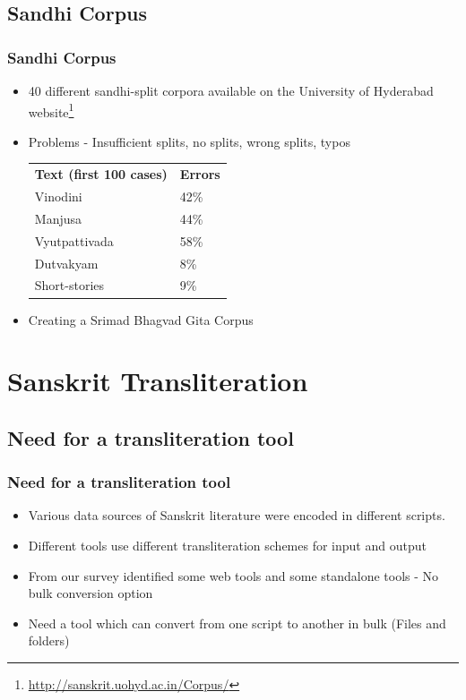 \documentclass[xcolor=dvipsnames]{beamer}
\begin{document}
\subsection{Sandhi Corpus}
\begin{frame}
\frametitle{Sandhi Corpus}
\begin{itemize}
\item 40 different sandhi-split corpora available on the University of Hyderabad website\footnote{\url{http://sanskrit.uohyd.ac.in/Corpus/}} 
\item Problems - Insufficient splits, no splits, wrong splits, typos
\begin{center}
\begin{tabular}{ l l }
\textbf{Text (first 100 cases)} & \textbf{Errors}\\
 Vinodini &  42\% \\ 
 Manjusa &   44\% \\  
 Vyutpattivada & 58\%   \\
 Dutvakyam & 8\% \\
 Short-stories & 9\% \\
\end{tabular}
\end{center}
\item Creating a Srimad Bhagvad Gita Corpus
\end{itemize}
\end{frame}



\section{Sanskrit Transliteration}

\subsection{Need for a transliteration tool}
\begin{frame}
\frametitle{Need for a transliteration tool}
\begin{itemize}
\item Various data sources of Sanskrit literature were encoded in different scripts.
\item Different tools use different transliteration schemes for input and output

\item From our survey identified some web tools and some standalone tools - No bulk conversion option
\item Need a tool which can convert from one script to another in bulk (Files and folders)
\end{itemize}
\end{frame}
\end{document}
